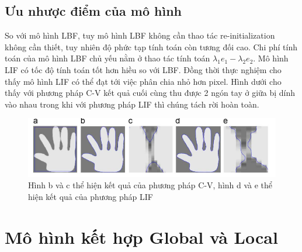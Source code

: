 \documentclass[12pt,oneside,a4]{report}
\begin{document}
\subsection{Ưu nhược điểm của mô hình}
So với mô hình LBF, tuy mô hình LBF không cần thao tác re-initialization không cần thiết, tuy nhiên độ phức tạp tính toán còn tương đối cao. Chi phí tính toán của mô hình LBF chủ yếu nằm ở thao tác tính toán $\lambda_1 e_1-\lambda_2 e_2$. Mô hình LIF có tốc độ tính toán tốt hơn hiều so với LBF. Đồng thời thực nghiệm cho thấy mô hình LIF có thể đạt tới việc phân chia nhỏ hơn pixel. Hình dưới cho thấy với phương pháp C-V kết quả cuối cùng thu được 2 ngón tay ở giữa bị dính vào nhau trong khi với phương pháp LIF thì chúng tách rời hoàn toàn.
\begin{center}
\begin{figure}
\caption{Hình b và c thể hiện kết quả của phương pháp C-V, hình  d và e thể hiện kết quả của phương pháp LIF}
\includegraphics[scale=0.7]{figure/subpixel.png}
\end{figure}

\end{center}   
\section{Mô hình kết hợp Global và Local}
\end{document}
